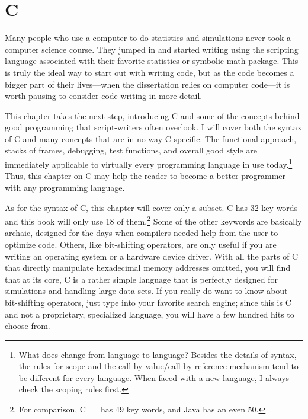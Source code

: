 	\chapter{C} \label{c_crash} 

Many people who use a computer to do statistics and simulations never
took a computer science course. They jumped in and started writing
using the scripting language associated with their favorite statistics or
symbolic math package. This is truly the ideal way to start out with writing
code, but as the code becomes a bigger part of their lives---when the
dissertation relies on computer code---it is worth pausing to consider
code-writing in more detail. 

This chapter takes the next step, introducing C and some of the
concepts behind good programming that script-writers often overlook.
I will cover both the syntax of C and many concepts that are in no way
C-specific. The functional approach, stacks of frames, debugging,
test functions, and overall good style are immediately applicable to
virtually every programming language in use today.\footnote{What does
change from language to language?  Besides the details of syntax, the
rules for scope and the call-by-value/call-by-reference mechanism tend
to be different for every language. When faced with a new language, I
always check the scoping rules first.} Thus, this chapter on C may help
the reader to become a better programmer with any programming language.

As for the syntax of C, this chapter will cover only a subset. C has
32 key words and this book will only use 18 of them.\footnote{For
comparison, C$^{++}$ has 49 key words, and  Java has an even 50.} Some of the other keywords are basically
archaic, designed for the days when compilers needed help from the user to
optimize code. Others, like bit-shifting operators, are only useful
if you are writing an operating system or a hardware device driver. With
all the parts of C that directly manipulate hexadecimal memory addresses
omitted, you will find that at its core, C is a rather simple language
that is perfectly designed for simulations and handling large data sets.
If you really do want to know about bit-shifting operators, just type
 into your favorite search engine; since this is C and
not a proprietary, specialized language, you will have a few hundred
hits to choose from.


